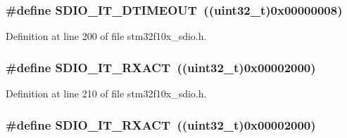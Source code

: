 \subsubsection[{\texorpdfstring{S\+D\+I\+O\+\_\+\+I\+T\+\_\+\+D\+T\+I\+M\+E\+O\+UT}{SDIO_IT_DTIMEOUT}}]{\setlength{\rightskip}{0pt plus 5cm}\#define S\+D\+I\+O\+\_\+\+I\+T\+\_\+\+D\+T\+I\+M\+E\+O\+UT~(({\bf uint32\+\_\+t})0x00000008)}\hypertarget{group___s_d_i_o___interrupt__sources_gaf5ce4bfa8459ccbe892791e5cdc26a6f}{}\label{group___s_d_i_o___interrupt__sources_gaf5ce4bfa8459ccbe892791e5cdc26a6f}


Definition at line 200 of file stm32f10x\+\_\+sdio.\+h.

\subsubsection[{\texorpdfstring{S\+D\+I\+O\+\_\+\+I\+T\+\_\+\+R\+X\+A\+CT}{SDIO_IT_RXACT}}]{\setlength{\rightskip}{0pt plus 5cm}\#define S\+D\+I\+O\+\_\+\+I\+T\+\_\+\+R\+X\+A\+CT~(({\bf uint32\+\_\+t})0x00002000)}\hypertarget{group___s_d_i_o___interrupt__sources_ga1d9a59a2415b57bdf9827423cb6ce3a0}{}\label{group___s_d_i_o___interrupt__sources_ga1d9a59a2415b57bdf9827423cb6ce3a0}


Definition at line 210 of file stm32f10x\+\_\+sdio.\+h.

\subsubsection[{\texorpdfstring{S\+D\+I\+O\+\_\+\+I\+T\+\_\+\+R\+X\+A\+CT}{SDIO_IT_RXACT}}]{\setlength{\rightskip}{0pt plus 5cm}\#define S\+D\+I\+O\+\_\+\+I\+T\+\_\+\+R\+X\+A\+CT~(({\bf uint32\+\_\+t})0x00002000)}\hypertarget{group___s_d_i_o___interrupt__sources_ga1d9a59a2415b57bdf9827423cb6ce3a0}{}\label{group___s_d_i_o___interrupt__sources_ga1d9a59a2415b57bdf9827423cb6ce3a0}


